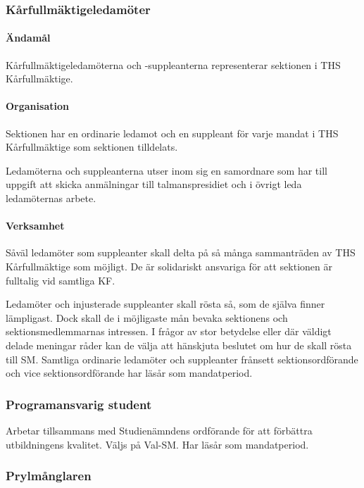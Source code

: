 \documentclass{dgovdoc}
\begin{document}
\subsubsection{Kårfullmäktigeledamöter}

\paragraph{Ändamål}

Kårfullmäktigeledamöterna och -suppleanterna representerar sektionen i THS Kårfullmäktige.

\paragraph{Organisation}

Sektionen har en ordinarie ledamot och en suppleant för varje mandat i THS Kårfullmäktige som sektionen tilldelats.

Ledamöterna och suppleanterna utser inom sig en samordnare som har till uppgift att skicka anmälningar till talmanspresidiet och i övrigt leda ledamöternas arbete.

\paragraph{Verksamhet}

Såväl ledamöter som suppleanter skall delta på så många sammanträden av THS Kårfullmäktige som möjligt. De är solidariskt ansvariga för att sektionen är fulltalig vid samtliga KF.

Ledamöter och injusterade suppleanter skall rösta så, som de själva finner lämpligast. Dock skall de i möjligaste mån bevaka sektionens och sektionsmedlemmarnas intressen. I frågor av stor betydelse eller där väldigt delade meningar råder kan de välja att hänskjuta beslutet om hur de skall rösta till SM. Samtliga ordinarie ledamöter och suppleanter frånsett sektionsordförande och vice sektionsordförande har läsår som mandatperiod.

\subsubsection{Programansvarig student}

Arbetar tillsammans med Studienämndens ordförande för att förbättra utbildningens kvalitet. Väljs på Val-SM. Har läsår som mandatperiod.

\subsubsection{Prylmånglaren}
\end{document}
